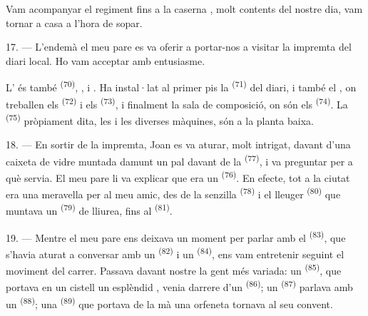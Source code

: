 Vam acompanyar el regiment fins a la caserna , molt contents del nostre dia, vam
tornar a casa a l'hora de sopar.

\VUsaut{3.0mm}

17. --- L'endemà el meu pare es va oferir a portar-nos a visitar la impremta del diari local.
Ho vam acceptar amb entusiasme.

L' és també  \textsuperscript{(70)},
,  i . Ha instal·lat al
primer pis la  \textsuperscript{(71)} del diari, i també el
, on treballen els 
\textsuperscript{(72)} i els  \textsuperscript{(73)}, i finalment
la sala de composició, on són els  \textsuperscript{(74)}. La
 \textsuperscript{(75)} pròpiament dita, les  i les
diverses màquines, són a la planta baixa.

\VUsaut{3.0mm}

18. --- En sortir de la impremta, Joan es va aturar, molt intrigat, davant d'una caixeta de
vidre muntada damunt un pal davant de la  \textsuperscript{(77)}, i va
preguntar per a què servia. El meu pare li va explicar que era un 
\textsuperscript{(76)}. En efecte, tot a la ciutat era una meravella per al meu amic, des de
la senzilla
 \textsuperscript{(78)} i el lleuger  \textsuperscript{(80)} que muntava un  \textsuperscript{(79)} de
lliurea, fins al  \textsuperscript{(81)}.

19. --- Mentre el meu pare ens deixava un moment per parlar amb el
 \textsuperscript{(83)}, que s'havia aturat a
conversar amb un  \textsuperscript{(82)} i un 
\textsuperscript{(84)}, ens vam entretenir seguint el moviment del carrer. Passava davant
nostre la gent més variada: un  \textsuperscript{(85)}, que
portava en un cistell un esplèndid , venia darrere d'un 
\textsuperscript{(86)}; un  \textsuperscript{(87)} parlava amb un
 \textsuperscript{(88)}; una
 \textsuperscript{(89)} que portava de la mà una orfeneta tornava al
seu convent.

